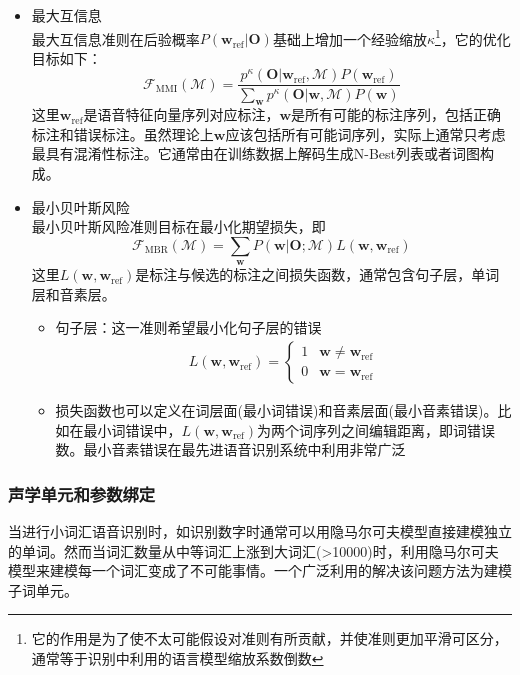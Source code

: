 \begin{itemize}
    \item 最大互信息 \\
    最大互信息准则在后验概率$P(\mathbf{w}_{\text{ref}}|\mathbf{O})$基础上增加一个经验缩放$\kappa$\footnote{它的作用是为了使不太可能假设对准则有所贡献，并使准则更加平滑可区分，通常等于识别中利用的语言模型缩放系数倒数}，它的优化目标如下：
    \begin{equation}
        \mathcal{F}_{\text{MMI}}(\mathcal{M})=\frac{p^{\kappa}(\mathbf{O}|\mathbf{w}_{\text{ref}},\mathcal{M})P(\mathbf{w}_{\text{ref}})}{\sum_{\mathbf{w}}p^{\kappa}(\mathbf{O}|\mathbf{w},\mathcal{M})P(\mathbf{w})}
    \end{equation}
    这里$\mathbf{w}_{\text{ref}}$是语音特征向量序列对应标注，$\mathbf{w}$是所有可能的标注序列，包括正确标注和错误标注。虽然理论上$\mathbf{w}$应该包括所有可能词序列，实际上通常只考虑最具有混淆性标注。它通常由在训练数据上解码生成N-Best列表或者词图构成。
    \item 最小贝叶斯风险 \\
    最小贝叶斯风险准则目标在最小化期望损失，即
    \begin{equation}
        \mathcal{F}_{\text{MBR}}(\mathcal{M})=\sum_{\mathbf{w}}P(\mathbf{w}|\mathbf{O};\mathcal{M})L(\mathbf{w},\mathbf{w}_{\text{ref}})
    \end{equation}
    这里$L(\mathbf{w},\mathbf{w}_{\text{ref}})$是标注与候选的标注之间损失函数，通常包含句子层，单词层和音素层。
    \begin{itemize}
        \item 句子层：这一准则希望最小化句子层的错误
        \begin{eqnarray}
            L(\mathbf{w},\mathbf{w}_{\text{ref}})=
            \begin{cases}
                1& \mathbf{w} \ne \mathbf{w}_{\text{ref}} \\
                0& \mathbf{w} = \mathbf{w}_{\text{ref}}
            \end{cases}
        \end{eqnarray}
        \item 损失函数也可以定义在词层面(最小词错误)和音素层面(最小音素错误)。比如在最小词错误中，$L(\mathbf{w},\mathbf{w}_{\text{ref}})$为两个词序列之间编辑距离，即词错误数。最小音素错误在最先进语音识别系统中利用非常广泛~\cite{povey2005discriminative}
    \end{itemize}
\end{itemize}

\subsubsection{声学单元和参数绑定}
当进行小词汇语音识别时，如识别数字时通常可以用隐马尔可夫模型直接建模独立的单词。然而当词汇数量从中等词汇上涨到大词汇(>10000)时，利用隐马尔可夫模型来建模每一个词汇变成了不可能事情。一个广泛利用的解决该问题方法为建模子词单元。

